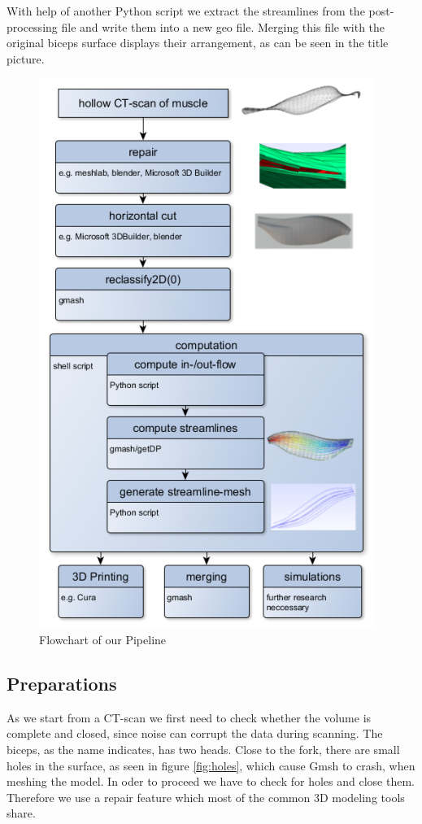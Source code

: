 \documentclass[preprint,journal]{vgtc}       %
\begin{document}
With help of another Python script we extract the streamlines from the post-processing file and write them into a new geo file. 
Merging this file with the original biceps surface displays their arrangement, as can be seen in the title picture.
\begin{figure}
	\begin{center}
		\includegraphics[width=0.95\linewidth]{flow.png}
	\end{center}
	\caption{Flowchart of our Pipeline}
	\label{fig:flow}
	
\end{figure}
\subsection{Preparations}
As we start from a CT-scan we first need to check whether the volume is complete and closed, since noise can corrupt the data during scanning.
The biceps, as the name indicates, has two heads. 
Close to the fork, there are small holes in the surface, as seen  in figure \ref{fig:holes}, which cause Gmsh to crash, when meshing the model. 
In oder to proceed we have to check for holes and close them.
Therefore we use a repair feature which most of the common 3D modeling tools share. 
\end{document}
